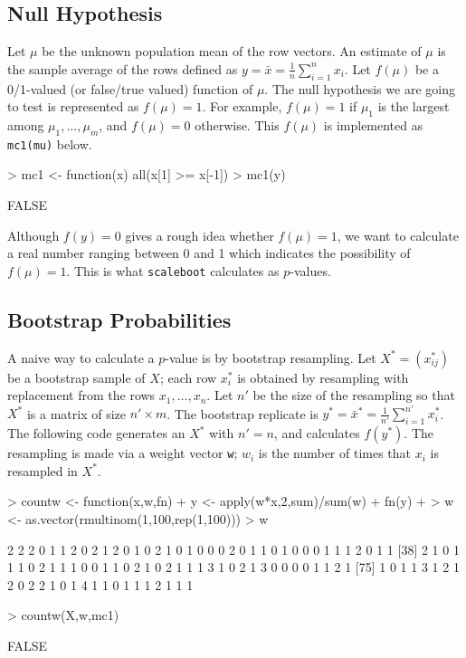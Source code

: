 \documentclass[a4paper]{amsart}
\begin{document}
\subsection{Null Hypothesis}

Let $\mu$ be the unknown population mean of the row vectors. An
estimate of $\mu$ is the sample average of the rows defined as $y =
\bar x = \tfrac{1}{n}\sum_{i=1}^n x_i $. Let $f(\mu)$ be a 0/1-valued
(or false/true valued) function of $\mu$. The null hypothesis we are
going to test is represented as $f(\mu)=1$. For example, $f(\mu)=1$ if
$\mu_1$ is the largest among $\mu_1,\ldots,\mu_m$, and $f(\mu)=0$
otherwise. This $f(\mu)$ is implemented as {\tt mc1(mu)} below.
\begin{Schunk}
\begin{Sinput}
> mc1 <- function(x) all(x[1] >= x[-1])
> mc1(y)
\end{Sinput}
\begin{Soutput}
[1] FALSE
\end{Soutput}
\end{Schunk}
Although $f(y)=0$ gives a rough idea whether $f(\mu)=1$, we want to
calculate a real number ranging between 0 and 1 which indicates the
possibility of $f(\mu)=1$.
This is what {\tt scaleboot} calculates as $p$-values. 

\subsection{Bootstrap Probabilities}

A naive way to calculate a $p$-value is by bootstrap resampling.  Let
$X^*=(x^*_{ij})$ be a bootstrap sample of $X$; each row $x^*_i$ is
obtained by resampling with replacement from the rows
$x_1,\ldots,x_n$.  Let $n'$ be the size of the resampling so that
$X^*$ is a matrix of size $n'\times m$. The bootstrap replicate is
$y^* = \bar x^* = \tfrac{1}{n'} \sum_{i=1}^{n'} x_i^*$. The following
code generates an $X^*$ with $n'=n$, and calculates $f(y^*)$. The
resampling is made via a weight vector {\tt w}; $w_i$ is the number of
times that $x_i$ is resampled in $X^*$.
\begin{Schunk}
\begin{Sinput}
> countw <- function(x,w,fn) {
+   y <- apply(w*x,2,sum)/sum(w)
+   fn(y)
+ }
> w <- as.vector(rmultinom(1,100,rep(1,100)))
> w
\end{Sinput}
\begin{Soutput}
  [1] 2 2 2 0 1 1 2 0 2 1 2 0 1 0 2 1 0 1 0 0 0 2 0 1 1 0 1 0 0 0 1 1 1 2 0 1 1
 [38] 2 1 0 1 1 1 0 2 1 1 1 0 0 1 1 0 2 1 0 2 1 1 1 3 1 0 2 1 3 0 0 0 0 1 1 2 1
 [75] 1 0 1 1 3 1 2 1 2 0 2 2 1 0 1 4 1 1 0 1 1 1 2 1 1 1
\end{Soutput}
\begin{Sinput}
> countw(X,w,mc1)
\end{Sinput}
\begin{Soutput}
[1] FALSE
\end{Soutput}
\end{Schunk}
\end{document}
